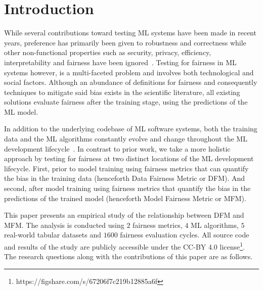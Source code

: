 \documentclass[sigconf,review,anonymous]{acmart}
\begin{document}
\section{Introduction}\label{sec:intro}




While several contributions toward testing ML systems have been made
in recent years, preference has primarily been given to robustness and
correctness while other non-functional properties such as security,
privacy, efficiency, interpretability and fairness have been
ignored \cite{zhang2020machine,zhang2021ignorance,mehrabi2021survey,wan2021modeling}. Testing
for fairness in ML systems however, is a multi-faceted problem and
involves both technological and social factors. Although an abundance
of definitions for fairness and consequently techniques to mitigate
said bias exists in the scientific literature, all existing solutions
evaluate fairness after the training stage, using the predictions of
the ML model.

In addition to the underlying codebase of ML software systems, both
the training data and the ML algorithms constantly evolve and change
throughout the ML development
lifecycle \cite{sculley2015hidden,bosch2021engineering,hutchinson2021towards}. In
contrast to prior work, we take a more holistic approach by testing
for fairness at two distinct locations of the ML development
lifecycle. First, prior to model training using fairness metrics that
can quantify the bias in the training data (henceforth Data Fairness
Metric or DFM). And second, after model training using fairness
metrics that quantify the bias in the predictions of the trained model
(henceforth Model Fairness Metric or MFM).

This paper presents an empirical study of the relationship between DFM
and MFM. The analysis is conducted using $2$ fairness metrics, $4$ ML
algorithms, $5$ real-world tabular datasets and $1600$ fairness
evaluation cycles. All source code and results of the study are
publicly accessible under the CC-BY 4.0
license\footnote{https://figshare.com/s/67206f7c219b12885a6f}. The
research questions along with the contributions of this paper are as
follows.
\end{document}
